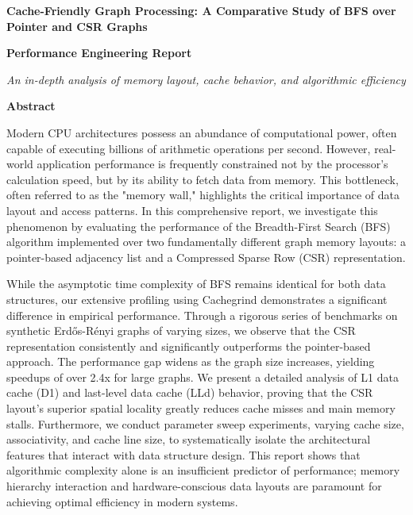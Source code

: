 \documentclass[11pt]{article}
\begin{document}
\begin{titlepage}
    \centering
    \vspace*{2cm}
    
    \Huge
    \textbf{Cache-Friendly Graph Processing: A Comparative Study of BFS over Pointer and CSR Graphs}
    
    \vspace{1.5cm}
    
    \Large
    \textbf{Performance Engineering Report}
    
    \vspace{2.5cm}
    
    \Large
    \textit{An in-depth analysis of memory layout, cache behavior, and algorithmic efficiency}
    
    \vfill
    
    \normalsize
    \textbf{Abstract}
    
    \vspace{0.5cm}
    \begin{flushleft}
    Modern CPU architectures possess an abundance of computational power, often capable of executing billions of arithmetic operations per second. However, real-world application performance is frequently constrained not by the processor's calculation speed, but by its ability to fetch data from memory. This bottleneck, often referred to as the "memory wall," highlights the critical importance of data layout and access patterns. In this comprehensive report, we investigate this phenomenon by evaluating the performance of the Breadth-First Search (BFS) algorithm implemented over two fundamentally different graph memory layouts: a pointer-based adjacency list and a Compressed Sparse Row (CSR) representation.
    
    While the asymptotic time complexity of BFS remains identical for both data structures, our extensive profiling using Cachegrind demonstrates a significant difference in empirical performance. Through a rigorous series of benchmarks on synthetic Erd\H{o}s-R\'enyi graphs of varying sizes, we observe that the CSR representation consistently and significantly outperforms the pointer-based approach. The performance gap widens as the graph size increases, yielding speedups of over 2.4x for large graphs. We present a detailed analysis of L1 data cache (D1) and last-level data cache (LLd) behavior, proving that the CSR layout's superior spatial locality greatly reduces cache misses and main memory stalls. Furthermore, we conduct parameter sweep experiments, varying cache size, associativity, and cache line size, to systematically isolate the architectural features that interact with data structure design. This report shows that algorithmic complexity alone is an insufficient predictor of performance; memory hierarchy interaction and hardware-conscious data layouts are paramount for achieving optimal efficiency in modern systems.
    \end{flushleft}
    
    \vspace{1.5cm}
\end{titlepage}
\end{document}
